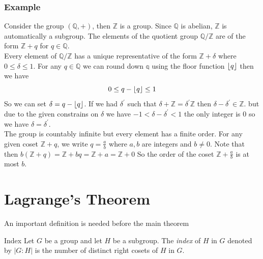 \documentclass[16pt,a4paper]{article}
\DeclarePairedDelimiter\floor{\lfloor}{\rfloor}
\theoremstyle{definition}
\begin{document}
\subsubsection*{Example} Consider the group $(\mathbb{Q},+)$, then $\mathbb{Z}$ is a group. Since $\mathbb{Q}$ is abelian, $\mathbb{Z}$ is automatically a subgroup. The elements of the quotient group $\mathbb{Q/Z}$ are of the form $\mathbb{Z}+q$ for $q\in \mathbb{Q}$.
\\
Every element of $\mathbb{Q/Z}$ has a unique representative of the form $\mathbb{Z} + \delta$ where $0\leq \delta \leq 1$. For any $q\in \mathbb{Q}$ we can round down $\mathbb{q}$ using the floor function  $\floor{q}$ then we have 
\[0\leq q-\floor{q}\leq 1\]
So we can set $\delta = q-\floor*{q}$. If we had $\delta^\prime$ such that $\delta + \mathbb{Z} = \delta^\prime \mathbb{Z}$ then $\delta - \delta^\prime \in \mathbb{Z}$. but due to the given constrains on $\delta$ we have $-1<\delta-\delta^\prime < 1$ the only integer is $0$ so we have $\delta=\delta^\prime$. 
\\
The group is countably infinite but every element has a finite order.  For any given coset $\mathbb{Z}+q$, we write $q=\frac ab$ where $a,b$ are integers and $b\neq 0$. Note that then $b(\mathbb{Z}+q) = \mathbb{Z}+bq = \mathbb{Z}+a=\mathbb{Z}+0$ So the order of the coset $\mathbb{Z}+\frac ab$ is at most $b$. 


\newpage

\section{Lagrange's Theorem}

An important definition is needed before the main theorem 

\begin{defn}{Index}{}
Let $G$ be a group and let $H$ be a subgroup. The \emph{index} of $H$ in $G$ denoted by $|G:H|$ is the number of distinct right cosets of $H$ in $G$. 
\end{defn} 
\end{document}
